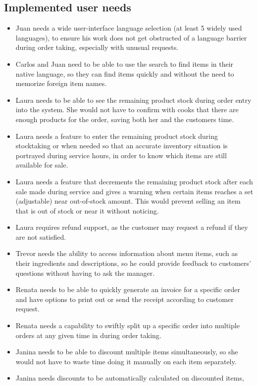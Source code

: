 \documentclass{article}
\begin{document}
\subsection{Implemented user needs}
\begin{itemize}
\item Juan needs a wide user-interface language selection (at least 5 widely
used languages), to ensure his work does not get obstructed of a language
barrier during order taking, especially with unusual requests.
\item  Carlos and Juan need to be able to use the search to find items in their
native language, so they can find items quickly and without the need to
memorize foreign item names.
\item  Laura needs to be able to see the remaining product stock during order
entry into the system. She would not have to confirm with cooks that there
are enough products for the order, saving both her and the customers time.
\item Laura needs a feature to enter the remaining product stock during stocktaking or when needed so that an accurate inventory situation is portrayed
during service hours, in order to know which items are still available for
sale.
\item  Laura needs a feature that decrements the remaining product stock after
each sale made during service and gives a warning when certain items
reaches a set (adjustable) near out-of-stock amount. This would prevent
selling an item that is out of stock or near it without noticing.
\item Laura requires refund support, as the customer may request a refund if
they are not satisfied.
\item Trevor needs the ability to access information about menu items, such as
their ingredients and descriptions, so he could provide feedback to customers’ questions without having to ask the manager.
\item Renata needs to be able to quickly generate an invoice for a specific order
and have options to print out or send the receipt according to customer
request.
\item  Renata needs a capability to swiftly split up a specific order into multiple
orders at any given time in during order taking.
\item Janina needs to be able to discount multiple items simultaneously, so she
would not have to waste time doing it manually on each item separately.
\item  Janina needs discounts to be automatically calculated on discounted items,

\end{itemize}
\end{document}
